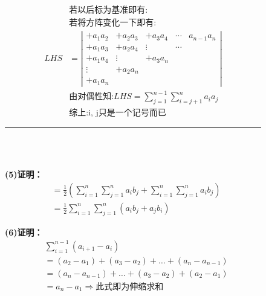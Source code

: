 \documentclass[fontset=windows]{article}
\begin{document}
\begin{figure}[!htb]
\begin{minipage}{0.5\linewidth}
\begin{align}
        &\mbox{若以后标为基准即有:}\nonumber\\
        &\mbox{若将方阵变化一下即有:}\nonumber\\
     LHS&=\left|
        \begin{array}{ccccc}
            +a_{1} a_{2} & +a_{2} a_{3} & +a_{3} a_{4} & \cdots & a_{n-1} a_{n} \\
            +a_{1} a_{3} & +a_{2} a_{4} & \vdots & \cdots& \\
            +a_{1} a_{4} & \vdots & +a_{3} a_{n} & & \\
            \vdots & +a_{2} a_{n} & & & \\
            +a_{1} a_{n} & & &
        \end{array}
        \right|\nonumber\\
        &\mbox{由对偶性知:}LHS=\sum_{j=1}^{n-1}\sum_{i=j+1}^{n}a_{i}a_{j}\nonumber\\
        &\mbox{综上:i, j只是一个记号而已}\nonumber
        \end{align}
    \end{minipage}
    \end{figure}
    \begin{figure}[!htb]
    \noindent\rule{\textwidth}{1pt}\\
    \vspace{3pt}\\
    \begin{minipage}[t]{0.3\linewidth}
        \textbf{(5)证明：}
        \begin{align}
        &=\frac{1}{2}\left(\sum_{{i}=1}^{{n}} \sum_{{j}=1}^{{n}} a_{{i}} {b}_{{j}}+\sum_{{i}=1}^{{n}} \sum_{{j}=1}^{{n}} a_{{i}} {b}_{{j}}\right) \nonumber\\
        &=\frac{1}{2} \sum_{{i}=1}^{{n}} \sum_{{j}=1}^{{n}}\left(a_{{i}} {b}_{{j}}+a_{{j}} {b}_{{i}}\right)\nonumber
        \end{align}
    \end{minipage}
    \hfill
    \begin{minipage}[t]{0.4\linewidth}
        \textbf{(6)证明：}
        \begin{align}
        &\sum_{i=1}^{n-1}\left(a_{i+1}-a_{i}\right)\nonumber \\
        &=\left(a_{2}-a_{1}\right)+\left(a_{3}-a_{2}\right)+\ldots+\left(a_{n}-a_{n-1}\right) \nonumber\\
        &=\left(a_{n}-a_{n-1}\right)+\ldots+\left(a_{3}-a_{2}\right)+\left(a_{2}-a_{1}\right) \nonumber\\
        &=a_{n}-a_{1}\Longrightarrow\mbox{此式即为伸缩求和}\nonumber
        \end{align}
    \end{minipage}
    \end{figure}
\end{document}
